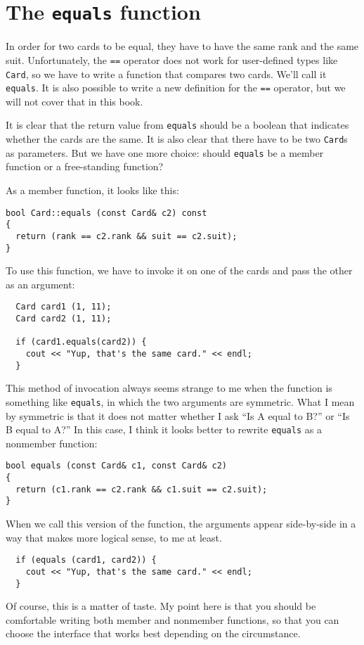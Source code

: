 \section{The {\tt equals} function}

In order for two cards to be equal, they have to have the same rank
and the same suit.  Unfortunately, the {\tt ==} operator does not work
for user-defined types like {\tt Card}, so we have to write a function
that compares two cards.  We'll call it {\tt equals}.  It is also
possible to write a new definition for the {\tt ==} operator, but we
will not cover that in this book.

It is clear that the return value from {\tt equals} should be a
boolean that indicates whether the cards are the same.  It is
also clear that there have to be two {\tt Card}s as parameters.
But we have one more choice: should {\tt equals} be a member
function or a free-standing function?

As a member function, it looks like this:

\begin{verbatim}
bool Card::equals (const Card& c2) const
{
  return (rank == c2.rank && suit == c2.suit);
}
\end{verbatim}
%
To use this function, we have to invoke it on one of the
cards and pass the other as an argument:

\begin{verbatim}
  Card card1 (1, 11);
  Card card2 (1, 11);

  if (card1.equals(card2)) {
    cout << "Yup, that's the same card." << endl;
  }
\end{verbatim}
%
This method of invocation always seems strange to me when the
function is something like {\tt equals}, in which the two
arguments are symmetric.  What I mean by symmetric is that it
does not matter whether I ask ``Is A equal to B?'' or
``Is B equal to A?''  In this case, I think it looks better to rewrite
{\tt equals} as a nonmember function:

\begin{verbatim}
bool equals (const Card& c1, const Card& c2)
{
  return (c1.rank == c2.rank && c1.suit == c2.suit);
}
\end{verbatim}
%
When we call this version of the function, the arguments
appear side-by-side in a way that makes more logical sense,
to me at least.

\begin{verbatim}
  if (equals (card1, card2)) {
    cout << "Yup, that's the same card." << endl;
  }
\end{verbatim}
%
Of course, this is a matter of taste.  My point here is that
you should be comfortable writing both member and nonmember
functions, so that you can choose the interface that works best
depending on the circumstance.

